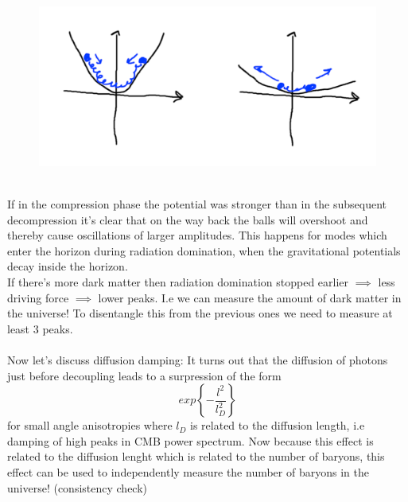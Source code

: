 \documentclass{article}
\begin{document}
\begin{figure}[h]
  \centering
  \includegraphics[scale=.5]{decaying.png}
\end{figure}\\
If in the compression phase the potential was stronger than in the subsequent decompression it's clear that on the way back the balls will overshoot and thereby cause oscillations of larger amplitudes. This happens for modes which enter the horizon during radiation domination, when the gravitational potentials decay inside the horizon.\\
If there's more dark matter then radiation domination stopped earlier $\implies$ less driving force $\implies$ lower peaks. I.e we can measure the amount of dark matter in the universe! To disentangle this from the previous ones we need to measure at least 3 peaks.\\\\

Now let's discuss diffusion damping: It turns out that the diffusion of photons just before decoupling leads to a surpression of the form 
\begin{equation}
  exp\left\{-\frac{l^2}{l_D^2}\right\}
\end{equation}
for small angle anisotropies where $l_D$ is related to the diffusion length, i.e damping of high peaks in CMB power spectrum. Now because this effect is related to the diffusion lenght which is related to the number of baryons, this effect can be used to independently measure the number of baryons in the universe! (consistency check)\\\\
\end{document}
